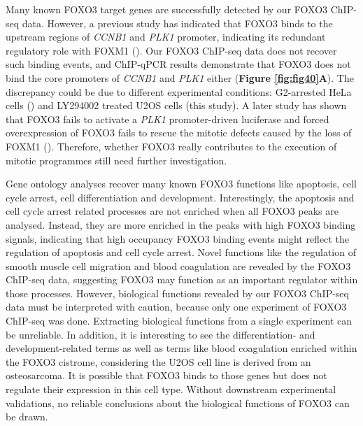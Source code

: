 Many known FOXO3 target genes are successfully detected by our FOXO3 ChIP-seq data. However, a previous study has indicated that FOXO3 binds to the upstream regions of \textit{CCNB1} and \textit{PLK1} promoter, indicating its redundant regulatory role with FOXM1 (\cite{alvarez2001forkhead}). Our FOXO3 ChIP-seq data does not recover such binding events, and ChIP-qPCR results demonstrate that FOXO3 does not bind the core promoters of \textit{CCNB1} and \textit{PLK1} either (\textbf{Figure \ref{fig:fig40}A}). The discrepancy could be due to different experimental conditions: G2-arrested HeLa cells (\cite{alvarez2001forkhead}) and LY294002 treated U2OS cells (this study). A later study has shown that FOXO3 fails to activate a \textit{PLK1} promoter-driven luciferase and forced overexpression of FOXO3 fails to rescue the mitotic defects caused by the loss of FOXM1 (\cite{laoukili2005foxm1}). Therefore, whether FOXO3 really contributes to the execution of mitotic programmes still need further investigation.

Gene ontology analyses recover many known FOXO3 functions like apoptosis, cell cycle arrest, cell differentiation and development. Interestingly, the apoptosis and cell cycle arrest related processes are not enriched when all FOXO3 peaks are analysed. Instead, they are more enriched in the peaks with high FOXO3 binding signals, indicating that high occupancy FOXO3 binding events might reflect the regulation of apoptosis and cell cycle arrest. Novel functions like the regulation of smooth muscle cell migration and blood coagulation are revealed by the FOXO3 ChIP-seq data, suggesting FOXO3 may function as an important regulator within those processes. However, biological functions revealed by our FOXO3 ChIP-seq data must be interpreted with caution, because only one experiment of FOXO3 ChIP-seq was done. Extracting biological functions from a single experiment can be unreliable. In addition, it is interesting to see the differentiation- and development-related terms as well as terms like blood coagulation enriched within the FOXO3 cistrome, considering the U2OS cell line is derived from an osteosarcoma. It is possible that FOXO3 binds to those genes but does not regulate their expression in this cell type. Without downstream experimental validations, no reliable conclusions about the biological functions of FOXO3 can be drawn.

